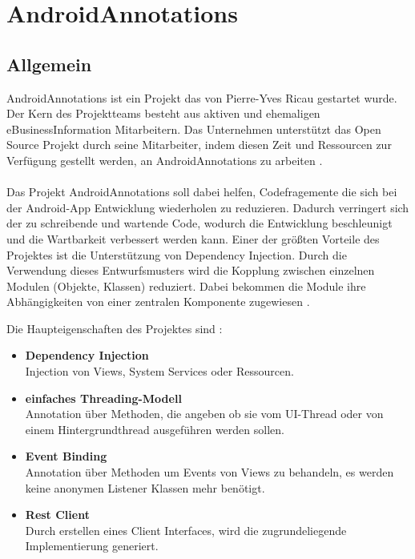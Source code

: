\newpage
\section{AndroidAnnotations}
\label{androidannoations}
\subsection{Allgemein}
AndroidAnnotations ist ein Projekt das von Pierre-Yves Ricau gestartet wurde. Der Kern des Projektteams besteht aus aktiven und ehemaligen eBusinessInformation Mitarbeitern. Das Unternehmen unterstützt das Open Source Projekt durch seine Mitarbeiter, indem diesen Zeit und Ressourcen zur Verfügung gestellt werden, an AndroidAnnotations zu arbeiten \cite{annotation:sponsors}.
\\\\
Das Projekt AndroidAnnotations soll dabei helfen, Codefragemente die sich bei der Android-App Entwicklung wiederholen zu reduzieren. Dadurch verringert sich der zu schreibende und wartende Code, wodurch die Entwicklung beschleunigt und die Wartbarkeit verbessert werden kann. Einer der größten Vorteile des Projektes ist die Unterstützung von Dependency Injection. Durch die Verwendung dieses Entwurfsmusters wird die Kopplung zwischen einzelnen Modulen (Objekte, Klassen) reduziert. Dabei bekommen die Module ihre Abhängigkeiten von einer zentralen Komponente zugewiesen \cite{annotation:spring}.

Die Haupteigenschaften des Projektes sind \cite{annotation:introduction}:

\begin{itemize}
	\item \textbf{Dependency Injection}\\
	Injection von Views, System Services oder Ressourcen.
	\item \textbf{einfaches Threading-Modell}\\
	Annotation über Methoden, die angeben ob sie vom UI-Thread oder von einem Hintergrundthread ausgeführen werden sollen.
	\item \textbf{Event Binding}\\
	Annotation über Methoden um Events von Views zu behandeln, es werden keine anonymen Listener Klassen mehr benötigt.
	\item \textbf{Rest Client}\\
	Durch erstellen eines Client Interfaces, wird die zugrundeliegende Implementierung generiert.
\end{itemize}

